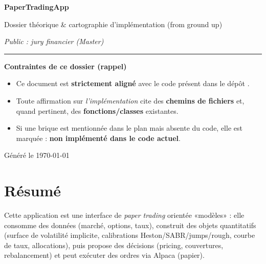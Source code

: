 \documentclass[11pt,a4paper]{report}
\theoremstyle{definition}
\theoremstyle{plain}
\theoremstyle{remark}
\newcommand{\1}{\mathbbm{1}}
\newcommand{\filepath}[1]{\texttt{\detokenize{#1}}}
\newcommand{\NonImplem}{\textbf{non implémenté dans le code actuel}}
\begin{document}
\begin{titlepage}
\centering
\vspace*{2cm}
{\Large\bfseries PaperTradingApp\par}
\vspace{0.4cm}
{\large Dossier théorique & cartographie d'implémentation (from ground up)\par}
\vspace{1.2cm}
{\large\itshape Public : jury financier (Master)\par}
\vspace{1.0cm}

\noindent\rule{0.9\textwidth}{0.4pt}\par
\vspace{0.6cm}

\begin{minipage}{0.9\textwidth}
\small
\textbf{Contraintes de ce dossier (rappel)}\par
\begin{itemize}[leftmargin=*]
\item Ce document est \textbf{strictement aligné} avec le code présent dans le dépôt \filepath{d:\PythonDProjects\PaperTradingApp}.
\item Toute affirmation sur \emph{l'implémentation} cite des \textbf{chemins de fichiers} et, quand pertinent, des \textbf{fonctions/classes} existantes.
\item Si une brique est mentionnée dans le plan mais absente du code, elle est marquée : \NonImplem.
\end{itemize}
\end{minipage}

\vfill
{\small Généré le \today\par}
\end{titlepage}

\chapter*{Résumé}
Cette application est une interface de \emph{paper trading} orientée «modèles» : elle consomme des données (marché, options, taux), construit des objets quantitatifs (surface de volatilité implicite, calibrations Heston/SABR/jumps/rough, courbe de taux, allocations), puis propose des décisions (pricing, couvertures, rebalancement) et peut exécuter des ordres via Alpaca (papier).
\end{document}
